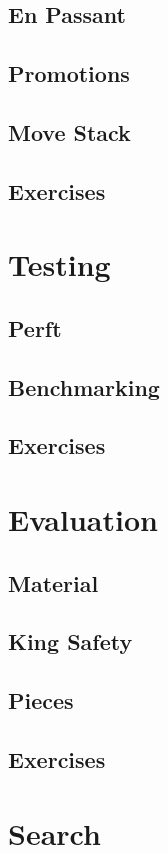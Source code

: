 \documentclass{article}
\begin{document}
\subsection{En Passant}
\subsection{Promotions}
\subsection{Move Stack}
\subsection{Exercises}

\section{Testing}
\subsection{Perft}
\subsection{Benchmarking}
\subsection{Exercises}

\section{Evaluation}
\subsection{Material}
\subsection{King Safety}
\subsection{Pieces}
\subsection{Exercises}

\section{Search}
\end{document}
